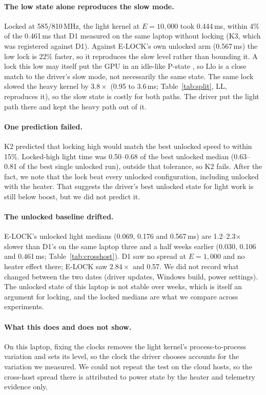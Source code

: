 \paragraph{The low state alone reproduces the slow mode.} Locked at 585/810\,MHz, the light kernel at $E=10{,}000$ took 0.444\,ms, within 4\% of the 0.461\,ms that D1 measured on the same laptop without locking (K3, which was registered against D1). Against E-LOCK's own unlocked arm (0.567\,ms) the low lock is 22\% faster, so it reproduces the slow level rather than bounding it. A lock this low may itself put the GPU in an idle-like P-state \citep{adamek2021fftedge}, so Llo is a close match to the driver's slow mode, not necessarily the same state. The same lock slowed the heavy kernel by $3.8\times$ (0.95 to 3.6\,ms; Table~\ref{tab:split}, LL, reproduces it), so the slow state is costly for both paths. The driver put the light path there and kept the heavy path out of it.

\paragraph{One prediction failed.} K2 predicted that locking high would match the best unlocked speed to within 15\%. Locked-high light time was 0.50--0.68 of the best unlocked median (0.63--0.81 of the best single unlocked run), outside that tolerance, so K2 fails. After the fact, we note that the lock beat every unlocked configuration, including unlocked with the heater. That suggests the driver's best unlocked state for light work is still below boost, but we did not predict it.

\paragraph{The unlocked baseline drifted.} E-LOCK's unlocked light medians (0.069, 0.176 and 0.567\,ms) are 1.2--2.3$\times$ slower than D1's on the same laptop three and a half weeks earlier (0.030, 0.106 and 0.461\,ms; Table~\ref{tab:crosshost}). D1 saw no spread at $E=1{,}000$ and no heater effect there; E-LOCK saw $2.84\times$ and 0.57. We did not record what changed between the two dates (driver updates, Windows build, power settings). The unlocked state of this laptop is not stable over weeks, which is itself an argument for locking, and the locked medians are what we compare across experiments.

\paragraph{What this does and does not show.} On this laptop, fixing the clocks removes the light kernel's process-to-process variation and sets its level, so the clock the driver chooses accounts for the variation we measured. We could not repeat the test on the cloud hosts, so the cross-host spread there is attributed to power state by the heater and telemetry evidence only.

